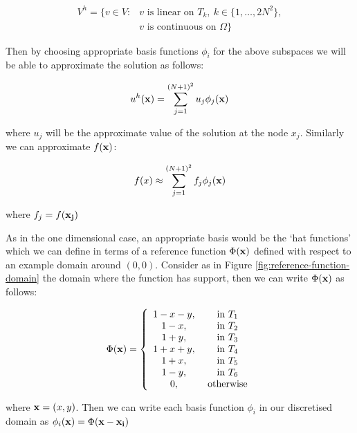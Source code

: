 \begin{align*}
    V^h = \{v \in V: &v \text{ is linear on } T_k,\ k \in \{1,\ldots,2N^2\}, \\
                     &v \text{ is continuous on } \Omega\}
\end{align*}

Then by choosing appropriate basis functions $\phi_i$ for the above subspaces
we will be able to approximate the solution as follows:

\begin{equation}
    u^h(\mathbf{x}) = \sum_{j=1}^{(N+1)^2}u_j\phi_j(\mathbf{x})
\end{equation}

where $u_j$ will be the approximate value of the solution at the node $x_j$.
Similarly we can approximate $f(\mathbf{x})$:

\begin{equation}
    f(x) \approx \sum_{j=1}^{(N+1)^2}f_j\phi_j(\mathbf{x})
\end{equation}

where $f_j = f(\mathbf{x_j})$


As in the one dimensional case, an appropriate basis would be the `hat
functions' which we can define in terms of a reference function $\Phi(\mathbf{x})$
defined with respect to an example domain around $(0,0)$.  Consider as in
Figure \ref{fig:reference-function-domain} the domain where the function has
support, then we can write $\Phi(\mathbf{x})$ as follows:

\begin{equation}\label{eq:two-d-ref-basis-fn}
    \Phi(\mathbf{x}) = \left\{\begin{array}{c c}
                    1 - x - y, & \text{ in } T_1 \\
                    1 - x,       & \text{ in } T_2 \\
                    1 + y,       & \text{ in } T_3 \\
                    1 + x + y,   & \text{ in } T_4 \\
                    1 + x,       & \text{ in } T_5 \\
                    1 - y,       & \text{ in } T_6 \\
                    0,           & \text{ otherwise}
                  \end{array}\right.
\end{equation}

where $\mathbf{x} = (x, y)$. Then we can write each basis function $\phi_i$ in our
discretised domain as $\phi_i(\mathbf{x}) = \Phi(\mathbf{x} - \mathbf{x_i})$


